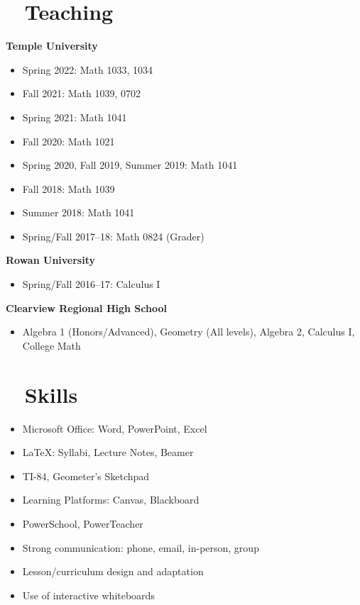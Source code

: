 \documentclass[10pt]{article}
\begin{document}
\section*{\faBookOpen ~ Teaching}
\textbf{Temple University}
\begin{itemize}
    \item Spring 2022: Math 1033, 1034
    \item Fall 2021: Math 1039, 0702
    \item Spring 2021: Math 1041
    \item Fall 2020: Math 1021
    \item Spring 2020, Fall 2019, Summer 2019: Math 1041
    \item Fall 2018: Math 1039
    \item Summer 2018: Math 1041
    \item Spring/Fall 2017--18: Math 0824 (Grader)
\end{itemize}

\textbf{Rowan University}
\begin{itemize}
    \item Spring/Fall 2016--17: Calculus I
\end{itemize}

\textbf{Clearview Regional High School}
\begin{itemize}
    \item Algebra 1 (Honors/Advanced), Geometry (All levels), Algebra 2, Calculus I, College Math
\end{itemize}

\section*{\faTools ~ Skills}
\begin{itemize}
    \item Microsoft Office: Word, PowerPoint, Excel
    \item LaTeX: Syllabi, Lecture Notes, Beamer
    \item TI-84, Geometer's Sketchpad
    \item Learning Platforms: Canvas, Blackboard
    \item PowerSchool, PowerTeacher
    \item Strong communication: phone, email, in-person, group
    \item Lesson/curriculum design and adaptation
    \item Use of interactive whiteboards
\end{itemize}
\end{document}
